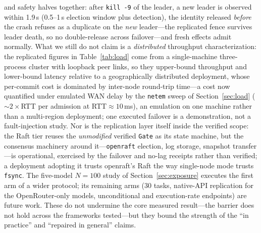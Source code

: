 \documentclass[10pt,journal,compsoc]{IEEEtran}
\begin{document}
and safety halves together: after \texttt{kill -9} of the leader, a new leader
is observed within 1.9\,s (0.5--1\,s election window plus detection), the
identity released \emph{before} the crash refuses as a duplicate on the
\emph{new} leader---the replicated fence survives leader death, so no
double-release across failover---and fresh effects admit normally. What we still do not claim is a
\emph{distributed} throughput characterization: the replicated figures in
Table~\ref{tab:load} come from a single-machine three-process cluster with
loopback peer links, so they upper-bound throughput and lower-bound latency
relative to a geographically distributed deployment, whose per-commit cost is
dominated by inter-node round-trip time---a cost now quantified under
emulated WAN delay by the \texttt{netem} sweep of Section~\ref{sec:load}
(${\sim}2{\times}$RTT per admission at RTT${\approx}10$\,ms), an emulation on
one machine rather than a multi-region deployment; one executed failover is a
demonstration, not a fault-injection study. Nor is the replication layer
itself inside the verified scope: the Raft tier reuses the \emph{unmodified}
verified \texttt{Gate} as its state machine, but the consensus machinery
around it---\texttt{openraft} election, log storage, snapshot
transfer---is operational, exercised by the failover and no-lag receipts
rather than verified; a deployment adopting it trusts openraft's Raft the
way single-node mode trusts \texttt{fsync}. The five-model $N{=}100$ study of Section~\ref{sec:exposure}
executes the first arm of a wider protocol; its remaining arms (30 tasks,
native-API replication for the OpenRouter-only models, unconditional and
execution-rate endpoints) are future work. These do not undermine the
core measured result---the barrier does not hold across the frameworks
tested---but they bound the strength of the ``in practice'' and ``repaired in
general'' claims.
\end{document}

